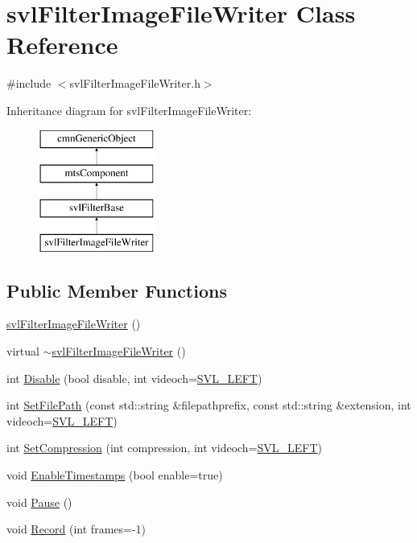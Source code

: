\hypertarget{classsvl_filter_image_file_writer}{\section{svl\-Filter\-Image\-File\-Writer Class Reference}
\label{classsvl_filter_image_file_writer}
}


{\ttfamily \#include $<$svl\-Filter\-Image\-File\-Writer.\-h$>$}

Inheritance diagram for svl\-Filter\-Image\-File\-Writer\-:\begin{figure}[H]
\begin{center}
\leavevmode
\includegraphics[height=4.000000cm]{db/dd0/classsvl_filter_image_file_writer}
\end{center}
\end{figure}
\subsection*{Public Member Functions}
\begin{DoxyCompactItemize}
\item 
\hyperlink{classsvl_filter_image_file_writer_ad8e4e4440cf4fe0ea14649495fc4e220}{svl\-Filter\-Image\-File\-Writer} ()
\item 
virtual \hyperlink{classsvl_filter_image_file_writer_a06cad16c566fa7b00c0669dbc11bb8d9}{$\sim$svl\-Filter\-Image\-File\-Writer} ()
\item 
int \hyperlink{classsvl_filter_image_file_writer_a40aaf6cacaf9bf36bbf32d4cd2f3e0be}{Disable} (bool disable, int videoch=\hyperlink{svl_definitions_8h_ab9fec7615f19c8df2919eebcab0b187f}{S\-V\-L\-\_\-\-L\-E\-F\-T})
\item 
int \hyperlink{classsvl_filter_image_file_writer_a6ec1a9ddd849c3d71469bb86a666acd5}{Set\-File\-Path} (const std\-::string \&filepathprefix, const std\-::string \&extension, int videoch=\hyperlink{svl_definitions_8h_ab9fec7615f19c8df2919eebcab0b187f}{S\-V\-L\-\_\-\-L\-E\-F\-T})
\item 
int \hyperlink{classsvl_filter_image_file_writer_a2674429141ffebd271507dc77603ef87}{Set\-Compression} (int compression, int videoch=\hyperlink{svl_definitions_8h_ab9fec7615f19c8df2919eebcab0b187f}{S\-V\-L\-\_\-\-L\-E\-F\-T})
\item 
void \hyperlink{classsvl_filter_image_file_writer_a8c59ebfc5b6c2a2a228cba756ff3dee7}{Enable\-Timestamps} (bool enable=true)
\item 
void \hyperlink{classsvl_filter_image_file_writer_ae16a97119e0b0036453324fcb816a031}{Pause} ()
\item 
void \hyperlink{classsvl_filter_image_file_writer_a5eee7896d9b546a2714cb3fcff46e188}{Record} (int frames=-\/1)
\end{DoxyCompactItemize}
